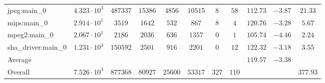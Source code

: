 \begin{tabular}{|l|c|c|c|c|c|c|c|c|c|c|}
jpeg:main\_0            & $ 4.323 \cdot 10^{3} $ & $ 487337 $ & $ 15386 $ & $ 4856  $ & $ 10515 $ & $ 8   $ & $ 58  $ & $ 112.73      $ & $ -3.87   $ & $ 21.33   $ \\
mips:main\_0            & $ 2.914 \cdot 10^{1} $ & $ 3519   $ & $ 1642  $ & $ 532   $ & $ 867   $ & $ 8   $ & $ 4   $ & $ 120.76      $ & $ -3.28   $ & $ 5.67    $ \\
mpeg2:main\_0           & $ 2.067 \cdot 10^{1} $ & $ 2186   $ & $ 2036  $ & $ 636   $ & $ 1357  $ & $ 0   $ & $ 1   $ & $ 105.74      $ & $ -4.46   $ & $ 2.24    $ \\
sha\_driver:main\_0     & $ 1.231 \cdot 10^{3} $ & $ 150592 $ & $ 2501  $ & $ 916   $ & $ 2201  $ & $ 0   $ & $ 12  $ & $ 122.32      $ & $ -3.18   $ & $ 3.55    $ \\
\hline
Average                 & $                    $ & $        $ & $       $ & $       $ & $       $ & $     $ & $     $ & $ 119.57      $ & $ -3.38   $ & $         $ \\
\hline
Overall                 & $ 7.526 \cdot 10^{3} $ & $ 877368 $ & $ 80927 $ & $ 25600 $ & $ 53317 $ & $ 327 $ & $ 110 $ & $             $ & $         $ & $ 377.93  $ \\
\hline
\end{tabular}
